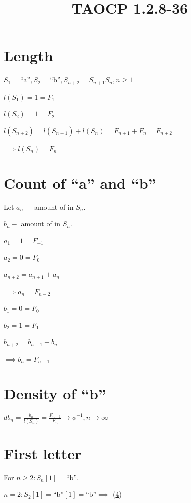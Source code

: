 \documentclass{article}
\title{TAOCP 1.2.8\mbox{-}36}
\begin{document}
\maketitle

\section{Length}\label{sec:length}

\( S_{1} = \text{``a''}, S_{2} = \text{``b''}, S_{n+2} = S_{n+1}S_{n}, n \geq 1 \)

\( l(S_{1}) = 1 = F_{1} \)

\( l(S_{2}) = 1 = F_{2} \)

\( l(S_{n+2}) = l(S_{n+1}) + l(S_{n}) = F_{n+1} + F_{n} = F_{n+2} \)

\( \implies l(S_{n}) = F_{n} \)

\section{Count of ``a'' and ``b''}\label{sec:count}

Let \( a_{n} - \) amount of  in \( S_{n} \).

\( b_{n} - \) amount of  in \( S_{n} \).

\( a_{1} = 1 = F_{-1} \)

\( a_{2} = 0 = F_{0} \)

\( a_{n+2} = a_{n+1} + a_{n} \)

\( \implies a_{n} = F_{n-2} \)

\( b_{1} = 0 = F_{0} \)

\( b_{2} = 1 = F_{1} \)

\( b_{n+2} = b_{n+1} + b_{n} \)

\( \implies b_{n} = F_{n-1} \)

\section{Density of ``b''}\label{sec:density}

\( db_{n} = \frac{b_{n}}{l(S_{n})} = \frac{F_{n-1}}{F_{n}} \to \phi^{-1}, n \to \infty \)

\section{First letter}\label{sec:first-letter}

For \( n \geq 2: S_{n}[1] = \text{``b''} \).

\( n = 2: S_{2}[1] = \text{``b''}[1] = \text{``b''} \implies \) (\ref{sec:first-letter})
\end{document}

